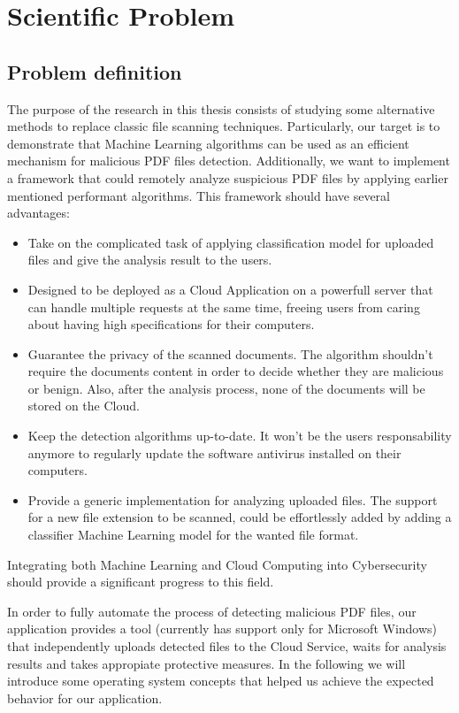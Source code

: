 \chapter{Scientific Problem}
\label{section:scientificProblem}

\section{Problem definition}
\label{section:problemDefinition}
The purpose of the research in this thesis consists of studying some alternative methods to replace classic file scanning techniques. Particularly, our target is to demonstrate that Machine Learning algorithms can be used as an efficient mechanism for malicious PDF files detection. Additionally, we want to implement a framework that could remotely analyze suspicious PDF files by applying earlier mentioned performant algorithms. This framework should have several advantages: 
\begin{itemize}
    \item Take on the complicated task of applying classification model for uploaded files and give the analysis result to the users.
    \item Designed to be deployed as a Cloud Application on a powerfull server that can handle multiple requests at the same time, freeing users from caring about having high specifications for their computers.
    \item Guarantee the privacy of the scanned documents. The algorithm shouldn't require the documents content in order to decide whether they are malicious or benign. Also, after the analysis process, none of the documents will be stored on the Cloud.
    \item Keep the detection algorithms up-to-date. It won't be the users responsability anymore to regularly update the software antivirus installed on their computers. 
    \item Provide a generic implementation for analyzing uploaded files. The support for a new file extension to be scanned, could be effortlessly added by adding a classifier Machine Learning model for the wanted file format.
\end{itemize}
Integrating both Machine Learning and Cloud Computing into Cybersecurity should provide a significant progress to this field. \par

In order to fully automate the process of detecting malicious PDF files, our application provides a tool (currently has support only for Microsoft Windows) that independently uploads detected files to the Cloud Service, waits for analysis results and takes appropiate protective measures. In the following we will introduce some operating system concepts that helped us achieve the expected behavior for our application.

